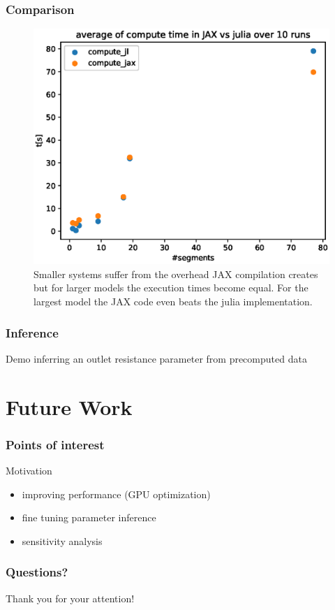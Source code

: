 \documentclass{beamer}
\begin{document}
\begin{frame}
	\frametitle{Comparison}
\begin{figure} [H]
    \centering
    \includegraphics[width=0.7\columnwidth]{images/comparison.eps}
    \caption{Smaller systems suffer from the overhead JAX compilation creates but
for larger models the execution times become equal. For the largest model the JAX
code even beats the julia implementation.}
    \label{fig:comparison}
\end{figure}

\end{frame}
\begin{frame}
	\frametitle{Inference}
	\begin{block}{Demo}
		inferring an outlet resistance parameter from precomputed data
	\end{block}
\end{frame}

\section{Future Work}
\begin{frame}
	\frametitle{Points of interest}
	\begin{block}{Motivation}
		\begin{itemize}
			\item improving performance (GPU optimization)
			\item fine tuning parameter inference
			\item sensitivity analysis
		\end{itemize}
	\end{block}
	\vspace{5mm}
\end{frame}

\begin{frame}
	\frametitle{Questions?}
	Thank you for your attention!
\end{frame}
\end{document}
